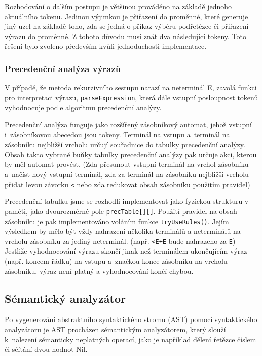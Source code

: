 \documentclass[12pt,a4paper,titlepage,final]{article}
\begin{document}
Rozhodování o dalším postupu je většinou prováděno na základě jednoho
aktuálního tokenu. Jedinou výjimkou je přiřazení do proměnné, které
generuje jiný uzel na základě toho, zda se jedná o příkaz výběru podřetězce
či přiřazení výrazu do proměnné. Z tohoto důvodu musí znát dva následující
tokeny. Toto řešení bylo zvoleno především kvůli jednoduchosti implementace.

\subsubsection{Precedenční analýza výrazů}
V případě, že metoda rekurzivního sestupu narazí na neterminál E, zavolá funkci
pro interpretaci výrazu, \texttt{parseExpression}, která dále vstupní posloupnost
tokenů vyhodnocuje podle algoritmu precedenční analýzy.

Precedenční analýza funguje jako rozšířený zásobníkový automat, jehož vstupní 
i~zá\-so\-bní\-ko\-vou abecedou jsou tokeny. Terminál na vstupu a~terminál na zásobníku
nejbližší vrcholu určují souřadnice do tabulky precedenční analýzy.
Obsah takto vybrané buňky tabulky precedenční analýzy pak určuje akci, kterou
by měl automat provést. (Zda přesunout vstupní terminál na vrchol zásobníku a~načíst 
nový vstupní terminál, zda za terminál na zásobníku nejbližší vrcholu přidat
levou závorku \texttt{<} nebo zda redukovat obsah zásobníku použitím pravidel)

Precedenční tabulku jsme se rozhodli implementovat jako fyzickou strukturu v paměti,
jako dvourozměrné pole \texttt{precTable[][]}. Použití pravidel na obsah zásobníku je
pak implementováno voláním funkce \texttt{tryUseRules()}. Jejím výsledkem by mělo být
vždy nahrazení několika terminálů a neterminálů na vrcholu zásobníku za jediný
neterminál. (např. \texttt{<E+E} bude nahrazeno za \texttt{E}) Jestliže vyhodnocování
výrazu skončí jinak než terminálem ukončujícím výraz (např. koncem řádku) na vstupu 
a~značkou konce zásobníku na vrcholu zásobníku, výraz není platný a vyhodnocování
končí chybou.
\subsection{Sémantický analyzátor}
Po vygenerování abstraktního syntaktického stromu (AST) pomocí syntaktického analyzátoru 
je AST procházen sémantickým analyzátorem, který slouží k~nalezení sémanticky 
neplatných operací, jako je například dělení řetězce číslem či sčítání dvou hodnot Nil.
\end{document}
